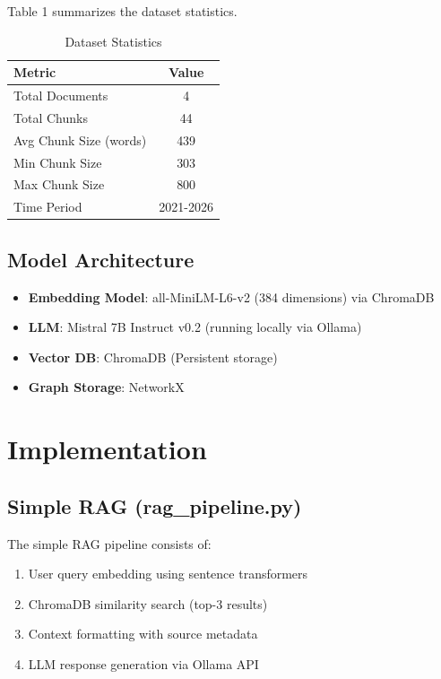 \documentclass[a4paper,12pt]{article}
\begin{document}
Table 1 summarizes the dataset statistics.

\begin{table}[h]
\begin{center}
\begin{tabular}{|l|c|}
\hline
Metric & Value\\
\hline
Total Documents & 4\\
Total Chunks & 44\\
Avg Chunk Size (words) & 439\\
Min Chunk Size & 303\\
Max Chunk Size & 800\\
Time Period & 2021-2026\\
\hline
\end{tabular}
\caption{Dataset Statistics}
\end{center}
\end{table}

\subsection{Model Architecture}
\begin{itemize}
    \item \textbf{Embedding Model}: all-MiniLM-L6-v2 (384 dimensions) via ChromaDB
    \item \textbf{LLM}: Mistral 7B Instruct v0.2 (running locally via Ollama)
    \item \textbf{Vector DB}: ChromaDB (Persistent storage)
    \item \textbf{Graph Storage}: NetworkX
\end{itemize}

\section{Implementation}

\subsection{Simple RAG (rag\_pipeline.py)}
The simple RAG pipeline consists of:
\begin{enumerate}
    \item User query embedding using sentence transformers
    \item ChromaDB similarity search (top-3 results)
    \item Context formatting with source metadata
    \item LLM response generation via Ollama API
\end{enumerate}
\end{document}
